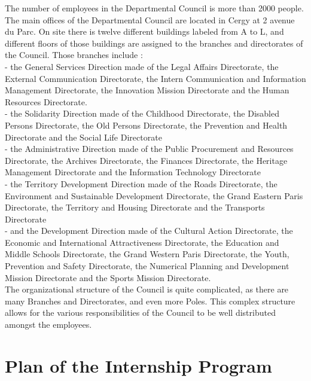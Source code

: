 \documentclass[12pt]{article}
\begin{document}
The number of employees in the Departmental Council is more than 2000 people. \\
The main offices of the Departmental Council are located in Cergy at 2 avenue du Parc. On site there is twelve different buildings labeled from A to L, and different floors of those buildings are assigned to the branches and directorates of the Council. Those branches include : \\
- the General Services Direction made of the Legal Affairs Directorate, the External Communication Directorate, the Intern Communication and Information Management Directorate, the Innovation Mission Directorate and the Human Resources Directorate. \\
- the Solidarity Direction made of the Childhood Directorate, the Disabled Persons Directorate, the Old Persons Directorate, the Prevention and Health Directorate and the Social Life Directorate \\
- the Administrative Direction made of the Public Procurement and Resources Directorate, the Archives Directorate, the Finances Directorate, the Heritage Management Directorate and the Information Technology Directorate \\
- the Territory Development Direction made of the Roads Directorate, the Environment and Sustainable Development Directorate, the Grand Eastern Paris Directorate, the Territory and Housing Directorate and the Transports Directorate \\
- and the Development Direction made of the Cultural Action Directorate, the Economic and International Attractiveness Directorate, the Education and Middle Schools Directorate, the Grand Western Paris Directorate, the Youth, Prevention and Safety Directorate, the Numerical Planning and Development Mission Directorate and the Sports Mission Directorate. \\
The organizational structure of the Council is quite complicated, as there are many Branches and Directorates, and even more Poles. This complex structure allows for the various responsibilities of the Council to be well distributed amongst the employees.

\clearpage
\section{Plan of the Internship Program}
\end{document}
